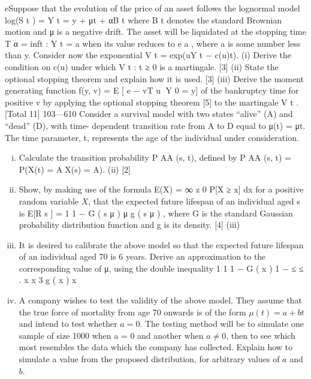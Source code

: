 \documentclass[a4paper,12pt]{article}
\begin{document}
\begin{enumerate}
eSuppose that the evolution of the price of an asset follows the lognormal model
log(S t ) = Y t = y + μt + αB t where B t denotes the standard Brownian motion and μ
is a negative drift. The asset will be liquidated at the stopping time
T α = inf{t : Y t = a} when its value reduces to e a , where a is some number less than
y. Consider now the exponential V t = exp(uY t − c(u)t).
(i) Derive the condition on c(u) under which {V t : t ≥ 0} is a martingale.
[3]
(ii) State the optional stopping theorem and explain how it is used.
[3]
(iii) Derive the moment generating function f(y, v) = E [ e − vT u Y 0 = y] of the
bankruptcy time for positive v by applying the optional stopping theorem
[5]
to the martingale V t .
[Total 11]
103—610
Consider a survival model with two states “alive” (A) and “dead” (D), with time-
dependent transition rate from A to D equal to μ(t) = μt. The time parameter, t,
represents the age of the individual under consideration.

\begin{enumerate}[(i)]
\item Calculate the transition probability P AA (s, t), defined by
P AA (s, t) = P(X(t) = AX(s) = A).
(ii)
[2]
\item Show, by making use of the formula
E(X) =
∞
z 0
P[X ≥ x] dx
for a positive random variable $X$, that the expected future lifespan of an
individual aged s is
E[R s ] =
1 1 − G ( s μ )
μ
g ( s μ )
,
where G is the standard Gaussian probability distribution function and g
is its density.
[4]
(iii)
\item It is desired to calibrate the above model so that the expected future
lifespan of an individual aged 70 is 6 years. Derive an approximation to
the corresponding value of μ, using the double inequality
1
1 1 − G ( x ) 1
−
≤
≤ .
x x 3
g ( x )
x
\item 
A company wishes to test the validity of the above model. They assume that the true force of mortality from age 70 onwards is of the form $\mu(t) = a + bt$ and intend to test whether $a = 0$. The testing method will be to simulate one sample of size 1000 when a = 0 and another when $a \neq 0$,
then to see which most resembles the data which the company has
collected.
Explain how to simulate a value from the proposed distribution, for
arbitrary values of $a$ and $b$.
\end{enumerate}


\end{enumerate}
\end{document}
